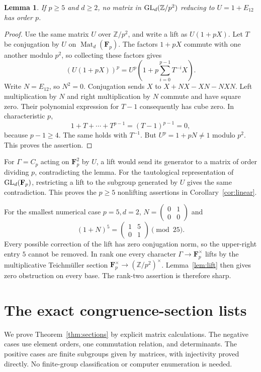 \documentclass[11pt]{article}
\newcommand{\Fp}{\mathbf F_p}\newcommand{\OO}{\mathcal O}
\newtheorem{lemma}[theorem]{Lemma}\newtheorem{proposition}[theorem]{Proposition}
\theoremstyle{definition}\newtheorem{definition}[theorem]{Definition}
\theoremstyle{remark}\newtheorem{remark}[theorem]{Remark}
\begin{document}
\begin{lemma}\label{lem:transvection}
If $p\geq5$ and $d\geq2$, no matrix in $\operatorname{GL}_d(\mathbb Z/p^2)$ reducing to $U=1+E_{12}$ has order $p$.
\end{lemma}
\begin{proof}
Use the same matrix $U$ over $\mathbb Z/p^2$, and write a lift as $U(1+pX)$. Let $T$ be conjugation by $U$ on $\operatorname{Mat}_d(\Fp)$. The factors $1+pX$ commute with one another modulo $p^2$, so collecting these factors gives
\[
 (U(1+pX))^p=U^p\left(1+p\sum_{i=0}^{p-1}T^{-i}X\right).
\]
Write $N=E_{12}$, so $N^2=0$. Conjugation sends $X$ to
$X+NX-XN-NXN$. Left multiplication by $N$ and right multiplication by $N$ commute and have square zero. Their polynomial expression for $T-1$ consequently has cube zero. In characteristic $p$,
\[
 1+T+\cdots+T^{p-1}=(T-1)^{p-1}=0,
\]
because $p-1\geq4$. The same holds with $T^{-1}$. But $U^p=1+pN\ne1$ modulo $p^2$. This proves the assertion.
\end{proof}

For $\Gamma=C_p$ acting on $\Fp^2$ by $U$, a lift would send its generator to a matrix of order dividing $p$, contradicting the lemma. For the tautological representation of $\GL_d(\Fp)$, restricting a lift to the subgroup generated by $U$ gives the same contradiction. This proves the $p\geq5$ nonlifting assertions in Corollary~\ref{cor:linear}.

For the smallest numerical case $p=5,d=2$, $N=\left(\begin{smallmatrix}0&1\\0&0\end{smallmatrix}\right)$ and
\[
 (1+N)^5=\begin{pmatrix}1&5\\0&1\end{pmatrix}
                       \pmod {25}.
\]
Every possible correction of the lift has zero conjugation norm, so the upper-right entry $5$ cannot be removed. In rank one every character $\Gamma\to\Fp^\times$ lifts by the multiplicative Teichm\"uller section $\Fp^\times\to(\mathbb Z/p^2)^\times$. Lemma~\ref{lem:lift} then gives zero obstruction on every base. The rank-two assertion is therefore sharp.

\section{The exact congruence-section lists}\label{sec:classification}

We prove Theorem~\ref{thm:sections} by explicit matrix calculations. The
negative cases use element orders, one commutation relation, and determinants.
The positive cases are finite subgroups given by matrices, with injectivity
proved directly. No finite-group classification or computer enumeration is
needed.
\end{document}
